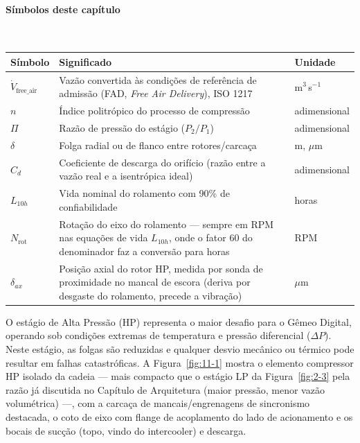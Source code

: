 \documentclass[12pt,a4paper]{article}
\numberwithin{equation}{section}
\numberwithin{table}{section}
\numberwithin{figure}{section}
\begin{document}
{\paragraph{Símbolos deste capítulo}\mbox{}\\[-0.5em]
{\small
\begin{longtable}{>{\raggedright\arraybackslash}p{2.6cm} >{\raggedright\arraybackslash}p{9.2cm} >{\raggedright\arraybackslash}p{2.6cm}}
	\toprule
	\textbf{Símbolo} & \textbf{Significado} & \textbf{Unidade} \\ \midrule
	\endhead
	$\dot{V}_{\text{free\_air}}$ & Vazão convertida às condições de referência de admissão (FAD, \textit{Free Air Delivery}), ISO 1217 & m$^3$\,s$^{-1}$ \\
	$n$ & Índice politrópico do processo de compressão & adimensional \\
	$\Pi$ & Razão de pressão do estágio ($P_2/P_1$) & adimensional \\
	$\delta$ & Folga radial ou de flanco entre rotores/carcaça & m, $\mu$m \\
	$C_d$ & Coeficiente de descarga do orifício (razão entre a vazão real e a isentrópica ideal) & adimensional \\
	$L_{10h}$ & Vida nominal do rolamento com 90\% de confiabilidade & horas \\
	$N_{\text{rot}}$\dag & Rotação do eixo do rolamento — sempre em RPM nas equações de vida $L_{10h}$, onde o fator 60 do denominador faz a conversão para horas & RPM \\
	$\delta_{ax}$ & Posição axial do rotor HP, medida por sonda de proximidade no mancal de escora (deriva por desgaste do rolamento, precede a vibração) & $\mu$m \\
	\bottomrule
\end{longtable}
}




	
	O estágio de Alta Pressão (HP) representa o maior desafio para o Gêmeo Digital, operando sob condições extremas de temperatura e pressão diferencial ($\Delta P$). Neste estágio, as folgas são reduzidas e qualquer desvio mecânico ou térmico pode resultar em falhas catastróficas. A Figura~\ref{fig:11-1} mostra o elemento compressor HP isolado da cadeia — mais compacto que o estágio LP da Figura~\ref{fig:2-3} pela razão já discutida no Capítulo de Arquitetura (maior pressão, menor vazão volumétrica) —, com a carcaça de mancais/engrenagens de sincronismo destacada, o coto de eixo com flange de acoplamento do lado de acionamento e os bocais de sucção (topo, vindo do intercooler) e descarga.

}
\end{document}
